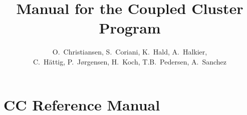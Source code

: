 \documentclass[12pt]{report}
\begin{document}
%

%


\title{Manual for the Coupled Cluster Program}

\author{
O.~Christiansen,
S.~Coriani, 
K.~Hald,
A.~Halkier,
\\
C.~H{\"a}ttig, 
P.~J{\o}rgensen,
H.~Koch, 
T.B.~Pedersen,
A.~Sanchez
}  

\maketitle

\tableofcontents


% 


%
%
% 
% 
%
%

% 
%
%
%
%
\part{CC Reference Manual}





%
%


%
%





%
%
\end{document}
